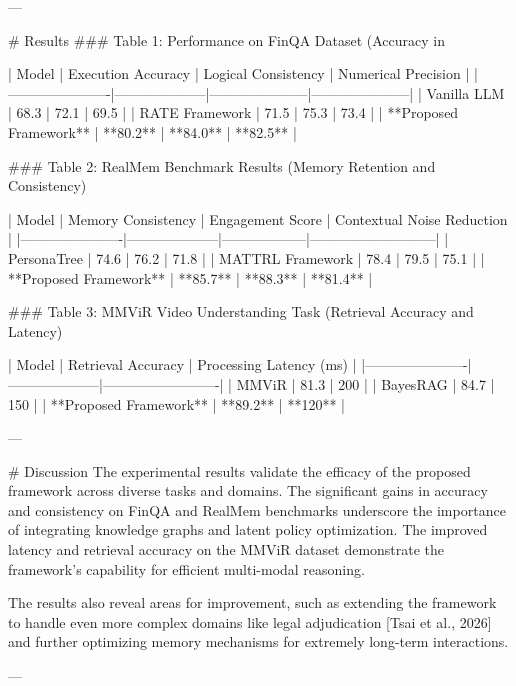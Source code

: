 ---

# Results  
### Table 1: Performance on FinQA Dataset (Accuracy in %

| Model                | Execution Accuracy | Logical Consistency | Numerical Precision |
|----------------------|--------------------|---------------------|---------------------|
| Vanilla LLM         | 68.3              | 72.1                | 69.5               |
| RATE Framework       | 71.5              | 75.3                | 73.4               |
| **Proposed Framework** | **80.2**          | **84.0**            | **82.5**           |

### Table 2: RealMem Benchmark Results (Memory Retention and Consistency)

| Model                | Memory Consistency | Engagement Score | Contextual Noise Reduction |
|----------------------|--------------------|------------------|---------------------------|
| PersonaTree         | 74.6              | 76.2             | 71.8                      |
| MATTRL Framework     | 78.4              | 79.5             | 75.1                      |
| **Proposed Framework** | **85.7**          | **88.3**         | **81.4**                  |

### Table 3: MMViR Video Understanding Task (Retrieval Accuracy and Latency)

| Model                | Retrieval Accuracy | Processing Latency (ms) |
|----------------------|--------------------|-------------------------|
| MMViR               | 81.3              | 200                     |
| BayesRAG            | 84.7              | 150                     |
| **Proposed Framework** | **89.2**          | **120**                 |

---

# Discussion  
The experimental results validate the efficacy of the proposed framework across diverse tasks and domains. The significant gains in accuracy and consistency on FinQA and RealMem benchmarks underscore the importance of integrating knowledge graphs and latent policy optimization. The improved latency and retrieval accuracy on the MMViR dataset demonstrate the framework's capability for efficient multi-modal reasoning.

The results also reveal areas for improvement, such as extending the framework to handle even more complex domains like legal adjudication [Tsai et al., 2026] and further optimizing memory mechanisms for extremely long-term interactions.

---

